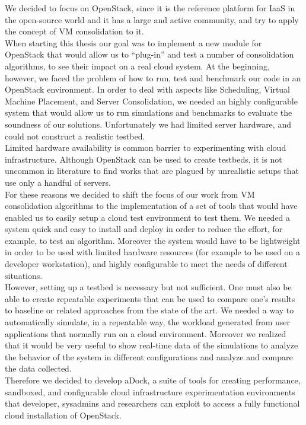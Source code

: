 We decided to focus on OpenStack, since it is the reference platform for IaaS in the open-source world and it has a large and active community, and try to apply the concept of VM consolidation to it.\\ 
When starting this thesis our goal was to implement a new module for OpenStack that would allow us to ``plug-in'' and test a number of consolidation algorithms, to see their impact on a real cloud system. At the beginning, however, we faced the problem of how to run, test and benchmark our code in an OpenStack environment. In order to deal with aspects like Scheduling, Virtual Machine Placement, and Server Consolidation, we needed an highly configurable system that would allow us to run simulations and benchmarks to evaluate the soundness of our solutions. Unfortunately we had limited server hardware, and could not construct a realistic testbed.\\
Limited hardware availability is common barrier to experimenting with cloud infrastructure. Although OpenStack can be used to create testbeds, it is not uncommon in literature to find works that are plagued by unrealistic setups that use only a handful of servers.\\
For these reasons we decided to shift the focus of our work from VM consolidation algorithms to the implementation of a set of tools that would have enabled us to easily setup a cloud test environment to test them. We needed a system quick and easy to install and deploy in order to reduce the effort, for example, to test an algorithm. Moreover the system would have to be lightweight in order to be used with limited hardware resources (for example to be used on a developer workstation), and highly configurable to meet the needs of different situations.\\
However, setting up a testbed is necessary but not sufficient. One must also be able to create repeatable experiments that can be used to compare one’s results to baseline or related approaches from the state of the art. We needed a way to automatically simulate, in a repeatable way, the workload generated from user applications that normally run on a cloud environment. Moreover we realized that it would be very useful to show real-time data of the simulations to analyze the behavior of the system in different configurations and analyze and compare the data collected.\\
Therefore we decided to develop aDock, a suite of tools for creating performance, sandboxed, and configurable cloud infrastructure experimentation environments that developer, sysadmins and researchers can exploit to access a fully functional cloud installation of OpenStack.

